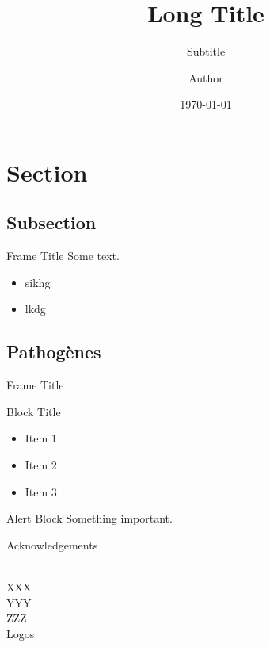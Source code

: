 \documentclass{myBeamerMinimal}
\title[Short Title]{Long Title}
\subtitle{Subtitle}
\author[Short Author]{Author}
\date{\today}
\institute{Institut\\
\bigskip
}
\begin{document}
\begin{frame}[plain]
	\titlepage
\end{frame}
\addtocounter{framenumber}{-1}

\AtBeginSection[]
{
	\frame{
		\sectionpage
	}
	\addtocounter{framenumber}{-1}
}


\section{Section}
\subsection{Subsection}

\begin{frame}{Frame Title}
	Some text.
	\begin{itemize}
		\item sikhg
		\item lkdg
	\end{itemize}
\end{frame}


\subsection{Pathogènes}

\begin{frame}{Frame Title}
	\begin{block}{Block Title}
	\begin{itemize}
		\item Item 1
		\item Item 2
		\item Item 3
	\end{itemize}
	\end{block}
	
	\begin{alertblock}{Alert Block}
		Something important.
	\end{alertblock}
\end{frame}


\backupbegin

\appendix
\begin{frame}[plain]{Acknowledgements}
	\begin{center}
	\\
	
	\medskip
	XXX\\
	\medskip
	YYY\\
	\medskip
	ZZZ\\
	
	\bigskip
	Logos
	\end{center}
	
\end{frame}

%

\backupend
\end{document}
